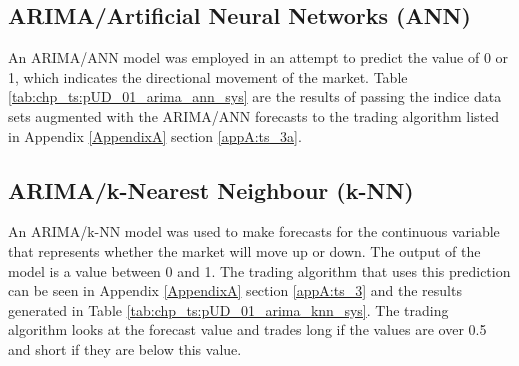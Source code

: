 \subsection{ARIMA/Artificial Neural Networks (ANN)}
An ARIMA/ANN model was employed in an attempt to predict the value of 0 or 1, which indicates the directional movement of the market. Table \ref{tab:chp_ts:pUD_01_arima_ann_sys} are the results of passing the indice data sets augmented with the ARIMA/ANN forecasts to the trading algorithm listed in Appendix \ref{AppendixA} section \ref{appA:ts_3a}.



\subsection{ARIMA/k-Nearest Neighbour (k-NN)}
An ARIMA/k-NN model was used to make forecasts for the continuous variable that represents whether the market will move up or down. The output of the model is a value between 0 and 1. The trading algorithm that uses this prediction can be seen in Appendix \ref{AppendixA} section \ref{appA:ts_3} and the results generated in Table \ref{tab:chp_ts:pUD_01_arima_knn_sys}. The trading algorithm looks at the forecast value and trades long if the values are over 0.5 and short if they are below this value.




%
%
%